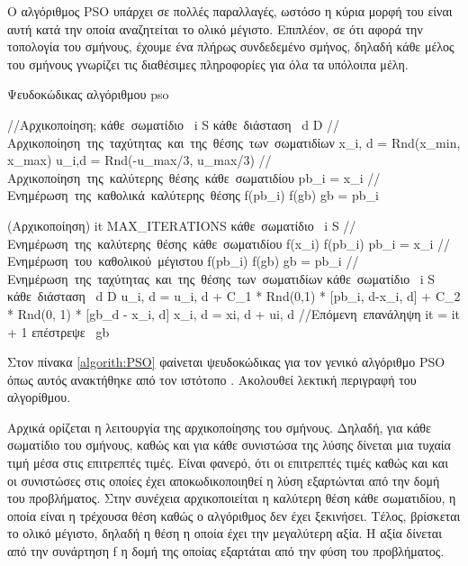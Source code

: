 \documentclass{assignment}
\begin{document}
Ο αλγόριθμος PSO υπάρχει σε πολλές παραλλαγές, ωστόσο η κύρια μορφή του είναι
αυτή κατά την οποία αναζητείται το ολικό μέγιστο. Επιπλέον, σε ότι αφορά την
τοπολογία του σμήνους, έχουμε ένα πλήρως συνδεδεμένο σμήνος, δηλαδή κάθε μέλος
του σμήνους γνωρίζει τις διαθέσιμες πληροφορίες για όλα τα υπόλοιπα μέλη.
\begin{algorithm}                        %
\caption{Ψευδοκώδικας αλγόριθμου pso}          %
\label{algorith:PSO}                      %
\begin{program}
\mbox{//Αρχικοποίηση};
  \FOR \mbox{κάθε σωματίδιο } i \in S \DO
    \FOR \mbox{κάθε διάσταση } d \in D \DO
    \mbox{//Αρχικοποίηση της ταχύτητας και της θέσης των σωματιδίων}
    x_{i, d} = Rnd(x_{min}, x_{max})
    u_{i,d} = Rnd(-u_{max/3}, u_{max}/3)
    \END
    \mbox{//Αρχικοποίηση της καλύτερης θέσης κάθε σωματιδίου}
    pb_i = x_i
    \mbox{//Ενημέρωση της καθολικά καλύτερης θέσης}
    \IF f(pb_i) \lt f(gb)
    \THEN gb = pb_i
    \FI
  \END

  \mbox{(Αρχικοποίηση)}
  \WHILE it \lt MAX\_ITERATIONS \DO
    \FOR \mbox{κάθε σωματίδιο } i \in S \DO
    \mbox{//Ενημέρωση της καλύτερης θέσης κάθε σωματιδίου}
    \IF f(x_i) \lt f(pb_i)
    \THEN pb_i = x_i
    \FI
    \mbox{//Ενημέρωση του καθολικού μέγιστου}
    \IF f(pb_i) \lt f(gb)
    \THEN gb = pb_i
    \FI
    \END
    \mbox{//Ενημέρωση της ταχύτητας και της θέσης των σωματιδίων}
    \FOR \mbox{κάθε σωματίδιο } i \in S \DO
        \FOR \mbox{κάθε διάσταση } d \in D \DO
            u_{i, d} = u_{i, d} + C_1 * Rnd(0,1) * [pb_{i, d}-x_{i, d}] + C_2 * Rnd(0, 1) * [gb_d - x_{i, d}]
            x_{i, d} = x{i, d} + u{i, d}
        \END
    \END
    \mbox{//Επόμενη επανάληψη}
    it = it + 1
  \END
  \mbox{επέστρεψε } gb
\end{program}
\end{algorithm}
Στον πίνακα \ref{algorith:PSO} φαίνεται ψευδοκώδικας για τον γενικό αλγόριθμο
PSO όπως αυτός ανακτήθηκε από τον ιστότοπο \cite{web:ist}. Ακολουθεί λεκτική
περιγραφή του αλγορίθμου.

Αρχικά ορίζεται η λειτουργία της αρχικοποίησης του σμήνους. Δηλαδή, για κάθε
σωματίδιο του σμήνους, καθώς και για κάθε συνιστώσα της λύσης δίνεται μια τυχαία
τιμή μέσα στις επιτρεπτές τιμές. Είναι φανερό, ότι οι επιτρεπτές τιμές καθώς και
και οι συνιστώσες στις οποίες έχει αποκωδικοποιηθεί η λύση εξαρτώνται από την
δομή του προβλήματος. Στην συνέχεια αρχικοποιείται η καλύτερη θέση κάθε
σωματιδίου, η οποία είναι η τρέχουσα θέση καθώς ο αλγόριθμος δεν έχει ξεκινήσει.
Τέλος, βρίσκεται το ολικό μέγιστο, δηλαδή η θέση η οποία έχει την μεγαλύτερη
αξία. Η αξία δίνεται από την συνάρτηση f η δομή της οποίας εξαρτάται από την
φύση του προβλήματος.
\end{document}
